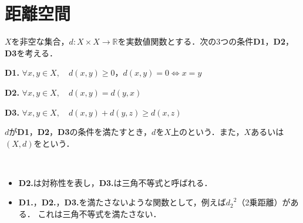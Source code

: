 \documentclass[uplatex]{jsarticle}
\begin{document}
\fi

\section{距離空間}

\begin{teigi}[距離空間]
    $X$を非空な集合，$d \colon X \times X \to \mathbb{R}$を実数値関数とする．次の3つの条件\textbf{D1}，\textbf{D2}，\textbf{D3}を考える．
    
    \textbf{D1. } $\forall x, y \in X, \quad d(x,y) \ge 0$，\qquad $d(x,y) = 0 \iff x = y$\par
    \textbf{D2. } $\forall x, y \in X, \quad d(x,y) = d(y,x)$\par
    \textbf{D3. } $\forall x, y \in X, \quad d(x,y) + d(y,z) \ge d(x,z)$
    
    $d$が\textbf{D1}，\textbf{D2}，\textbf{D3}の条件を満たすとき，$d$を$X$上のという．また，$X$あるいは$(X,d)$をという．
\end{teigi}

\begin{remark}~\par
    \begin{itemize}
        \item \textbf{D2.}は対称性を表し，\textbf{D3.}は三角不等式と呼ばれる．
        \item \textbf{D1.}，\textbf{D2.}，\textbf{D3.}を満たさないような関数として，例えば${d_{2}}^{2}$（2乗距離）がある．
        これは三角不等式を満たさない．
    \end{itemize}
\end{remark}
\end{document}
